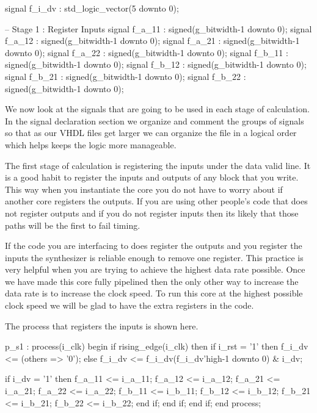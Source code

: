 \begin{VHDLlisting}[tabsize=2]
signal f_i_dv : std_logic_vector(5 downto 0);

-- Stage 1 : Register Inputs
signal f_a_11 : signed(g_bitwidth-1 downto 0);
signal f_a_12 : signed(g_bitwidth-1 downto 0);
signal f_a_21 : signed(g_bitwidth-1 downto 0);
signal f_a_22 : signed(g_bitwidth-1 downto 0);
signal f_b_11 : signed(g_bitwidth-1 downto 0);
signal f_b_12 : signed(g_bitwidth-1 downto 0);
signal f_b_21 : signed(g_bitwidth-1 downto 0);
signal f_b_22 : signed(g_bitwidth-1 downto 0);
\end{VHDLlisting}

We now look at the signals that are going to be used in each stage of calculation. In the signal declaration section we organize and comment the groups of signals so that as our \ac{VHDL} files get larger we can organize the file in a logical order which helps keeps the logic more manageable. 

The first stage of calculation is registering the inputs under the data valid line. It is a good habit to register the inputs and outputs of any block that you write. This way when you instantiate the core you do not have to worry about if another core registers the outputs. If you are using other people's code that does not register outputs and if you do not register inputs then its likely that those paths will be the first to fail timing. 

If the code you are interfacing to does register the outputs and you register the inputs the synthesizer is reliable enough to remove one register. This practice is very helpful when you are trying to achieve the highest data rate possible. Once we have made this core fully pipelined then the only other way to increase the data rate is to increase the clock speed. To run this core at the highest possible clock speed we will be glad to have the extra registers in the code. 

The process that registers the inputs is shown here. 

\begin{VHDLlisting}[tabsize=2]
p_s1 : process(i_clk)
	begin
		if rising_edge(i_clk) then
			if i_rst = '1' then
				f_i_dv <= (others => '0');
			else
				f_i_dv <= f_i_dv(f_i_dv'high-1 downto 0) & i_dv;
				
				if i_dv = '1' then
					f_a_11  <= i_a_11;
				    f_a_12  <= i_a_12;
				    f_a_21  <= i_a_21;
				    f_a_22  <= i_a_22;
				    f_b_11  <= i_b_11;
				    f_b_12  <= i_b_12;
				    f_b_21  <= i_b_21;
				    f_b_22  <= i_b_22;
				end if;
			end if;
		end if;
	end process;
\end{VHDLlisting}

